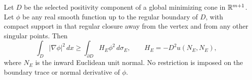\begin{proposition}
\label{geo:euclidean-stability}
Let $D$ be the selected positivity component of a global minimizing
cone in $\mathbb R^{m+1}$. Let $\phi$ be any real smooth function up to the
regular boundary of $D$, with compact support in that regular closure
away from the vertex and from any other singular points. Then
\begin{equation}\label{geo:euclidean-inequality}
 \int_D |\nabla\phi|^2\,dx
 \ge \int_{\partial D}H_E\phi^2\,d\sigma_E,
 \qquad H_E=-D^2u(N_E,N_E),
\end{equation}
where $N_E$ is the inward Euclidean unit normal. No restriction is
imposed on the boundary trace or normal derivative of $\phi$.
\end{proposition}

